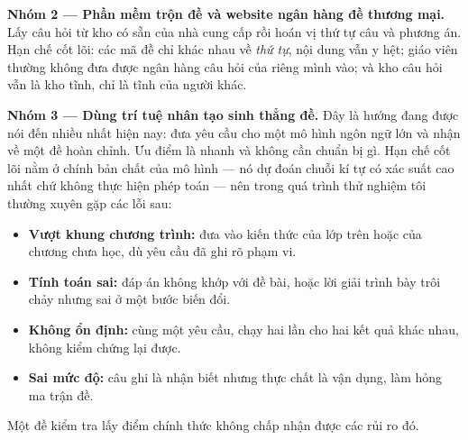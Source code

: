 \textbf{Nhóm 2 --- Phần mềm trộn đề và website ngân hàng đề thương mại.} Lấy câu
hỏi từ kho có sẵn của nhà cung cấp rồi hoán vị thứ tự câu và phương án. Hạn chế
cốt lõi: các mã đề chỉ khác nhau về \textit{thứ tự}, nội dung vẫn y hệt; giáo
viên thường không đưa được ngân hàng câu hỏi của riêng mình vào; và kho câu hỏi
vẫn là kho tĩnh, chỉ là tĩnh của người khác.

\textbf{Nhóm 3 --- Dùng trí tuệ nhân tạo sinh thẳng đề.} Đây là hướng đang được
nói đến nhiều nhất hiện nay: đưa yêu cầu cho một mô hình ngôn ngữ lớn và nhận về
một đề hoàn chỉnh. Ưu điểm là nhanh và không cần chuẩn bị gì. Hạn chế cốt lõi
nằm ở chính bản chất của mô hình --- nó dự đoán chuỗi kí tự có xác suất cao nhất
chứ không thực hiện phép toán --- nên trong quá trình thử nghiệm tôi thường
xuyên gặp các lỗi sau:

\begin{itemize}[leftmargin=1.2cm, itemsep=2pt]
  \item \textbf{Vượt khung chương trình:} đưa vào kiến thức của lớp trên hoặc
        của chương chưa học, dù yêu cầu đã ghi rõ phạm vi.
  \item \textbf{Tính toán sai:} đáp án không khớp với đề bài, hoặc lời giải
        trình bày trôi chảy nhưng sai ở một bước biến đổi.
  \item \textbf{Không ổn định:} cùng một yêu cầu, chạy hai lần cho hai kết quả
        khác nhau, không kiểm chứng lại được.
  \item \textbf{Sai mức độ:} câu ghi là nhận biết nhưng thực chất là vận dụng,
        làm hỏng ma trận đề.
\end{itemize}

Một đề kiểm tra lấy điểm chính thức không chấp nhận được các rủi ro đó.

